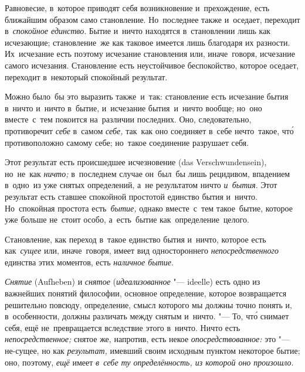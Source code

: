 Равновесие, в~которое приводят себя возникновение и~прехождение, есть ближайшим
образом само становление. Но~последнее также и~оседает, переходит
в~{\em спокойное единство}. Бытие и~ничто находятся в~становлении лишь как
исчезающие; становление~же как таковое имеется лишь благодаря их разности.
Их~исчезание есть поэтому исчезание становления или, иначе~говоря, исчезание
самого исчезания. Становление есть неустойчивое беспокойство, которое оседает,
переходит в~некоторый спокойный результат.

Можно было~бы это выразить также~и~так: становление есть исчезание бытия
в~ничто и~ничто в~бытие, и~исчезание бытия~и~ничто вообще; но~оно вместе~с~тем
покоится на~различии последних. Оно, следовательно, противоречит {\em себе}
в~самом {\em себе,} так~как оно соединяет в~себе нечто~такое, чт\'{о}
противоположно самому себе; но~такое соединение разрушает себя.

Этот результат есть происшедшее исчезновение (das Ver\-schwun\-den\-sein),
но~не~как {\em ничто;} в~последнем случае он~был~бы лишь рецидивом, впадением
в~одно~из уже снятых определений, а~не результатом ничто {\em и~бытия}. Этот
результат есть ставшее спокойной простотой единство бытия и~ничто. Но~спокойная
простота есть~{\em бытие,} однако вместе~с~тем такое~бытие, которое уже больше
не~стоит особо, а~есть~бытие как~определение~целого.

Становление, как переход в~такое единство бытия и~ничто, которое есть
как~{\em сущее} или, иначе~говоря, имеет вид одностороннего
{\em непосредственного} единства этих моментов, есть {\em наличное бытие}.


{\em Снятие} (Aufheben) и {\em снятое} ({\em идеализованное} "--- ideelle) есть
одно из важнейших понятий философии, основное определение, которое возвращается
решительно повсюду, определение, смысл которого мы должны точно понять и,
в~особенности, должны различать между снятым и~ничто. "--- То, чт\'{о} снимает
себя, ещё не~превращается вследствие этого в~ничто. Ничто есть {\em
непосредственное;} снятое же, напротив, есть некое {\em опосредствованное:} это
"--- не-сущее, но как {\em результат,} имевший своим исходным пунктом некоторое
бытие; оно, поэтому, {\em ещё} имеет {\em в~себе ту определённость, из которой
оно произошло}.

